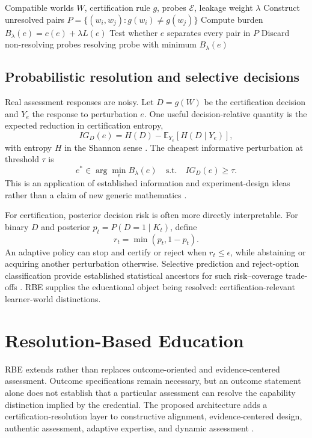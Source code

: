 \documentclass[11pt]{article}
\newcommand{\cE}{\mathcal{E}}
\begin{document}
\begin{algorithm}[t]
\caption{Minimum Resolution-Restoring Perturbation (deterministic form). Source: authors' RBE implementation.}
\label{alg:det}
\begin{algorithmic}[1]
\Require Compatible worlds $W$, certification rule $g$, probes $\cE$, leakage weight $\lambda$
\State Construct unresolved pairs $P=\{(w_i,w_j):g(w_i)\neq g(w_j)\}$
\For{each $e\in\cE$}
  \State Compute burden $B_\lambda(e)=c(e)+\lambda L(e)$
  \State Test whether $e$ separates every pair in $P$
\EndFor
\State Discard non-resolving probes
\State \Return resolving probe with minimum $B_\lambda(e)$
\end{algorithmic}
\end{algorithm}

\subsection{Probabilistic resolution and selective decisions}
Real assessment responses are noisy. Let $D=g(W)$ be the certification decision and $Y_e$ the response to perturbation $e$. One useful decision-relative quantity is the expected reduction in certification entropy,
\[
 IG_D(e)=H(D)-\mathbb{E}_{Y_e}[H(D\mid Y_e)],
\]
with entropy $H$ in the Shannon sense \parencite{shannon1948}. The cheapest informative perturbation at threshold $\tau$ is
\[
 e^*\in\arg\min_e B_\lambda(e)
 \quad\text{s.t.}\quad
 IG_D(e)\ge \tau.
\]
This is an application of established information and experiment-design ideas rather than a claim of new generic mathematics \parencite{lindley1956,blackwell1953,settles2009}.

For certification, posterior decision risk is often more directly interpretable. For binary $D$ and posterior $p_t=P(D=1\mid K_t)$, define
\[
 r_t=\min(p_t,1-p_t).
\]
An adaptive policy can stop and certify or reject when $r_t\le\epsilon$, while abstaining or acquiring another perturbation otherwise. Selective prediction and reject-option classification provide established statistical ancestors for such risk--coverage trade-offs \parencite{chow1970,elyaniv2010,gangrade2021}. RBE supplies the educational object being resolved: certification-relevant learner-world distinctions.

\section{Resolution-Based Education}
RBE extends rather than replaces outcome-oriented and evidence-centered assessment. Outcome specifications remain necessary, but an outcome statement alone does not establish that a particular assessment can resolve the capability distinction implied by the credential. The proposed architecture adds a certification-resolution layer to constructive alignment, evidence-centered design, authentic assessment, adaptive expertise, and dynamic assessment \parencite{biggs1996alignment,mislevy2003ecd,gulikers2004authentic,hatano1986adaptive,allal2000zpd}.
\end{document}
